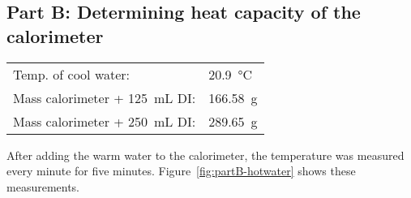 \documentclass[11pt, titlepage]{article}
\begin{document}
        \subsection{Part B: Determining heat capacity of the calorimeter}
            \begin{tabular}{l l}
                Temp. of cool water: & \SI{20.9}{\degreeCelsius} \\
                Mass calorimeter + \SI{125}{\milli\liter} DI: & \SI{166.58}{\gram} \\
                Mass calorimeter + \SI{250}{\milli\liter} DI: & \SI{289.65}{\gram} \\
            \end{tabular}
            \vspace{8pt}
            \par
            After adding the warm water to the calorimeter, the temperature was measured every minute for five minutes. Figure~\ref{fig:partB-hotwater} shows these measurements.
\end{document}
